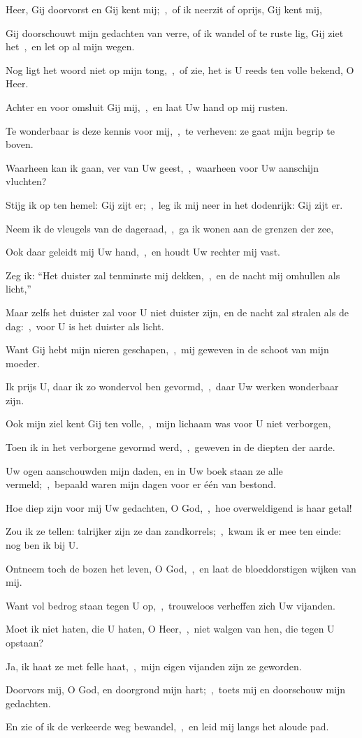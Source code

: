 \documentclass[12pt,twoside,a5paper]{article}
\begin{document}
\begin{halfparskip}
  Heer, Gij doorvorst en Gij kent mij;~\sep\ of ik neerzit of oprijs, Gij kent mij,


  Gij doorschouwt mijn gedachten van verre, of ik wandel of te ruste lig, Gij ziet het~\sep\ en let op al mijn wegen.

  Nog ligt het woord niet op mijn tong,~\sep\ of zie, het is U reeds ten volle bekend, O Heer.

  Achter en voor omsluit Gij mij,~\sep\ en laat Uw hand op mij rusten.

  Te wonderbaar is deze kennis voor mij,~\sep\ te verheven: ze gaat mijn begrip te boven.

  Waarheen kan ik gaan, ver van Uw geest,~\sep\ waarheen voor Uw aanschijn vluchten?

  Stijg ik op ten hemel: Gij zijt er;~\sep\ leg ik mij neer in het dodenrijk: Gij zijt er.

  Neem ik de vleugels van de dageraad,~\sep\ ga ik wonen aan de grenzen der zee,

  Ook daar geleidt mij Uw hand,~\sep\ en houdt Uw rechter mij vast.

  Zeg ik: ``Het duister zal tenminste mij dekken,~\sep\ en de nacht mij omhullen als licht,''

  Maar zelfs het duister zal voor U niet duister zijn, en de nacht zal stralen als de dag:~\sep\ voor U is het duister als licht.

  Want Gij hebt mijn nieren geschapen,~\sep\ mij geweven in de schoot van mijn moeder.

  Ik prijs U, daar ik zo wondervol ben gevormd,~\sep\ daar Uw werken wonderbaar zijn.

  Ook mijn ziel kent Gij ten volle,~\sep\ mijn lichaam was voor U niet verborgen,

  Toen ik in het verborgene gevormd werd,~\sep\ geweven in de diepten der aarde.

  Uw ogen aanschouwden mijn daden, en in Uw boek staan ze alle vermeld;~\sep\ bepaald waren mijn dagen voor er één van bestond.

  Hoe diep zijn voor mij Uw gedachten, O God,~\sep\ hoe overweldigend is haar getal!

  Zou ik ze tellen: talrijker zijn ze dan zandkorrels;~\sep\ kwam ik er mee ten einde: nog ben ik bij U.

  Ontneem toch de bozen het leven, O God,~\sep\ en laat de bloeddorstigen wijken van mij.

  Want vol bedrog staan tegen U op,~\sep\ trouweloos verheffen zich Uw vijanden.

  Moet ik niet haten, die U haten, O Heer,~\sep\ niet walgen van hen, die tegen U opstaan?

  Ja, ik haat ze met felle haat,~\sep\ mijn eigen vijanden zijn ze geworden.

  Doorvors mij, O God, en doorgrond mijn hart;~\sep\ toets mij en doorschouw mijn gedachten.

  En zie of ik de verkeerde weg bewandel,~\sep\ en leid mij langs het aloude pad.
\end{halfparskip}
\end{document}
